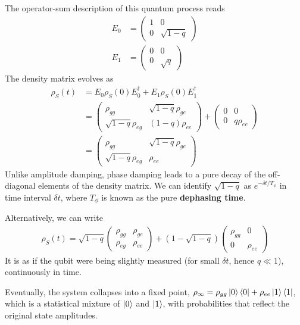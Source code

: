 The operator-sum description of this quantum process reads
\begin{align*}
    E_0&=\begin{pmatrix}
        1 & 0 \\ 0 & \sqrt{1-q}
    \end{pmatrix}\\
    E_1&=\begin{pmatrix}
        0 & 0 \\ 0&\sqrt{q}
    \end{pmatrix}
\end{align*}
The density matrix evolves as
\begin{align*}
    \rho_S(t)&=E_0\rho_S(0)E_0^\dagger+E_1\rho_S(0)E_1^\dagger\\
    &=\begin{pmatrix}
        \rho_{gg} & \sqrt{1-q}\rho_{ge}\\ \sqrt{1-q}\rho_{eg}& (1-q)\rho_{ee}
    \end{pmatrix}+\begin{pmatrix}
        0 & 0 \\ 0 & q\rho_{ee}
    \end{pmatrix}\\
    &=\begin{pmatrix}
        \rho_{gg} & \sqrt{1-q}\rho_{ge}\\ \sqrt{1-q}\rho_{eg}& \rho_{ee}
    \end{pmatrix}
\end{align*}
Unlike amplitude damping, phase damping leads to a pure decay of the off-diagonal elements of the density matrix. We can identify $\sqrt{1-q}$ as $e^{-\delta t/T_\phi}$ in time interval $\delta t$, where $T_\phi$ is known as the pure \textbf{dephasing time}. 

Alternatively, we can write
\begin{align*}
    \rho_S(t)=\sqrt{1-q}\begin{pmatrix}
        \rho_{gg} & \rho_{ge}\\ \rho_{eg} & \rho_{ee}
    \end{pmatrix}+(1-\sqrt{1-q})\begin{pmatrix}
        \rho_{gg} & 0\\ 0 & \rho_{ee}
    \end{pmatrix}
\end{align*}
It is as if the qubit were being slightly measured (for small $\delta t$, hence $q\ll 1$), continuously in time.

Eventually, the system collapses into a fixed point, $\rho_{\infty}= \rho_{gg} \ket{0}\bra{0} + \rho_{ee} \ket{1}\bra{1}$, which is a statistical mixture of $\ket{0}$ and $\ket{1}$, with probabilities that reflect the original state amplitudes.

